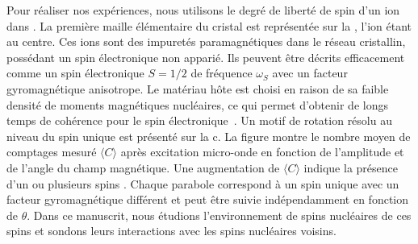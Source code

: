 Pour réaliser nos expériences, nous utilisons le degré de liberté de spin d'un ion \Er dans \Ca. La première maille élémentaire du cristal est représentée sur la , l'ion \Er étant au centre. Ces ions sont des impuretés paramagnétiques dans le réseau cristallin, possédant un spin électronique non apparié. Ils peuvent être décrits efficacement comme un spin électronique $S=1/2$ de fréquence $\omega_S$ avec un facteur gyromagnétique anisotrope. Le matériau hôte est choisi en raison de sa faible densité de moments magnétiques nucléaires, ce qui permet d'obtenir de longs temps de cohérence pour le spin électronique~. Un motif de rotation résolu au niveau du spin unique est présenté sur la c. La figure montre le nombre moyen de comptages mesuré $\langle C \rangle$ après excitation micro-onde en fonction de l'amplitude et de l'angle du champ magnétique. Une augmentation de $\langle C \rangle$ indique la présence d'un ou plusieurs spins \Er. Chaque parabole correspond à un spin \Er unique avec un facteur gyromagnétique différent et peut être suivie indépendamment en fonction de $\theta$. Dans ce manuscrit, nous étudions l'environnement de spins nucléaires de ces spins et sondons leurs interactions avec les spins nucléaires voisins.

